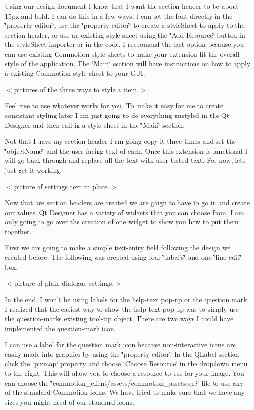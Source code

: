 Using our design document I know that I want the section header to be about 15px and bold. I can do this in a few ways. I can set the font directly in the \char`\"{}property editor\char`\"{}, use the \char`\"{}property editor\char`\"{} to create a style\-Sheet to apply to the section header, or use an existing style sheet using the \char`\"{}\-Add Resource\char`\"{} button in the style\-Sheet importer or in the code. I recoomend the last option because you can use existing Commotion style sheets to make your extension fit the overall style of the application. The \char`\"{}\-Main\char`\"{} section will have instructions on how to apply a existing Commotion style sheet to your G\-U\-I.

$<$pictures of the three ways to style a item.$>$

Feel free to use whatever works for you. To make it easy for me to create consistant styling later I am just going to do everything unstyled in the Qt Designer and then call in a style-\/sheet in the \char`\"{}\-Main\char`\"{} section.

Not that I have my section header I am going copy it three times and set the \char`\"{}object\-Name\char`\"{} and the user-\/facing text of each. Once this extension is functional I will go back through and replace all the text with user-\/tested text. For now, lets just get it working.

$<$picture of settings text in place.$>$

Now that are section headers are created we are goign to have to go in and create our values. Qt Designer has a variety of widgets that you can choose from. I am only going to go over the creation of one widget to show you how to put them together.

First we are going to make a simple text-\/entry field following the design we created before. The following was created using four \char`\"{}label's\char`\"{} and one \char`\"{}line edit\char`\"{} box.

$<$picture of plain dialogue settings.$>$

In the end, I won't be using labels for the help-\/text pop-\/up or the question mark. I realized that the easiest way to show the help-\/text pop up was to simply use the question-\/marks existing tool-\/tip object. There are two ways I could have implemented the question-\/mark icon.

I can use a label for the question mark icon because non-\/interactive icons are easily made into graphics by using the \char`\"{}property editor.\char`\"{} In the Q\-Label section click the \char`\"{}pixmap\char`\"{} property and choose \char`\"{}\-Choose Resource\char`\"{} in the dropdown menu to the right. This will allow you to choose a resource to use for your image. You can choose the \char`\"{}commotion\-\_\-client/assets/commotion\-\_\-assets.\-qrc\char`\"{} file to use any of the standard Commotion icons. We have tried to make sure that we have any sizes you might need of our standard icons.


